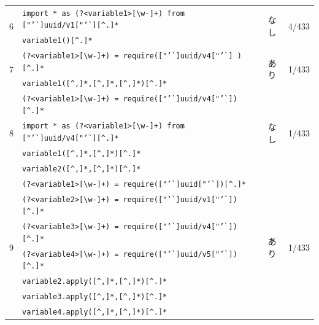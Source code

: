 \documentclass[11pt]{jreport}
\begin{document}
\begin{table}[t]
{\begin{tabular}{c|l|c|r}
            \multirow{2}{*}{6} & \texttt{import * as (?\textless{}variable1\textgreater{}{[}\textbackslash{}w-{]}+) from ["'\`{}]uuid/v1["'\`{}][\^{}.]*} & \multirow{2}{*}{なし}  &  \multirow{2}{*}{4/433} \\ \cline{2-2}
            & \texttt{variable1()[\^{}.]*} & & \\ \hline
            
            \multirow{2}{*}{7} & \texttt{(?\textless{}variable1\textgreater{}{[}\textbackslash{}w-{]}+) = require(["'\`{}]uuid/v4["'\`{}] )[\^{}.]*} & \multirow{2}{*}{あり} & \multirow{2}{*}{1/433}  \\ \cline{2-2}
            & \texttt{variable1([\textasciicircum,]*,[\textasciicircum,]*,[\textasciicircum,]*)[\^{}.]*} & & \\ \hline
            
            \multirow{4}{*}{8} & \texttt{(?\textless{}variable1\textgreater{}{[}\textbackslash{}w-{]}+) = require(["'\`{}]uuid/v4["'\`{}])[\^{}.]*} & \multirow{4}{*}{なし} & \multirow{4}{*}{1/433}  \\
            & \texttt{import * as (?\textless{}variable1\textgreater{}{[}\textbackslash{}w-{]}+) from ["'\`{}]uuid/v4["'\`{}][\^{}.]*} & & \\ \cline{2-2}
            & \texttt{variable1([\textasciicircum,]*,[\textasciicircum,]*)[\^{}.]*}& & \\ 
            & \texttt{variable2([\textasciicircum,]*,[\textasciicircum,]*)[\^{}.]*}& & \\ \hline
            
            \multirow{7}{*}{9} & \texttt{(?\textless{}variable1\textgreater{}{[}\textbackslash{}w-{]}+) = require(["'\`{}]uuid["'\`{}])[\^{}.]*} & \multirow{7}{*}{あり} & \multirow{7}{*}{1/433} \\ 
            & \texttt{(?\textless{}variable2\textgreater{}{[}\textbackslash{}w-{]}+) = require(["'\`{}]uuid/v1["'\`{}])[\^{}.]*} & & \\
            & \texttt{(?\textless{}variable3\textgreater{}{[}\textbackslash{}w-{]}+) = require(["'\`{}]uuid/v4["'\`{}])[\^{}.]*} & & \\
            & \texttt{(?\textless{}variable4\textgreater{}{[}\textbackslash{}w-{]}+) = require(["'\`{}]uuid/v5["'\`{}])[\^{}.]*} & & \\ \cline{2-2}
            
            & \texttt{variable2.apply([\textasciicircum,]*,[\textasciicircum,]*)[\^{}.]*}& & \\ 
            & \texttt{variable3.apply([\textasciicircum,]*,[\textasciicircum,]*)[\^{}.]*}& & \\
            & \texttt{variable4.apply([\textasciicircum,]*,[\textasciicircum,]*)[\^{}.]*}& & \\ \hline
        \end{tabular}
    }
\end{table}
 
\end{document}

